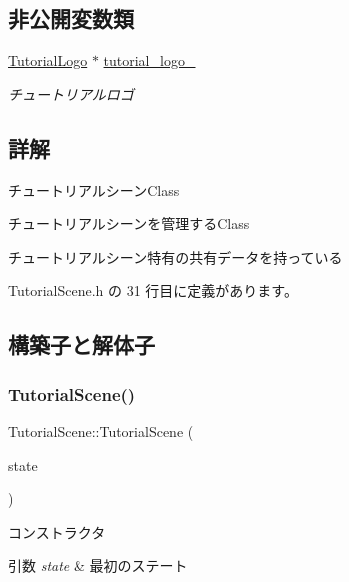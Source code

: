 \subsection*{非公開変数類}
\begin{DoxyCompactItemize}
\item 
\mbox{\hyperlink{class_tutorial_logo}{Tutorial\+Logo}} $\ast$ \mbox{\hyperlink{class_tutorial_scene_a3c2e0e47c2e6078bb7eff928d72fde2a}{tutorial\+\_\+logo\+\_\+}}
\begin{DoxyCompactList}\small\item\em チュートリアルロゴ \end{DoxyCompactList}\end{DoxyCompactItemize}


\subsection{詳解}
チュートリアルシーン\+Class 

チュートリアルシーンを管理する\+Class

チュートリアルシーン特有の共有データを持っている 

 Tutorial\+Scene.\+h の 31 行目に定義があります。



\subsection{構築子と解体子}
\mbox{\label{class_tutorial_scene_a90f8c010bd72aa3dae61a5294fdfbeb7}} 
\subsubsection{\texorpdfstring{Tutorial\+Scene()}{TutorialScene()}}
{\footnotesize\ttfamily Tutorial\+Scene\+::\+Tutorial\+Scene (\begin{DoxyParamCaption}\item[{\mbox{\hyperlink{class_scene_base_1_1_state_base}{State\+Base}} $\ast$}]{state }\end{DoxyParamCaption})}



コンストラクタ 


\begin{DoxyParams}{引数}
{\em state} & 最初のステート \\
\hline
\end{DoxyParams}


